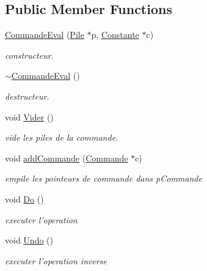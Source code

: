 \subsection*{Public Member Functions}
\begin{DoxyCompactItemize}
\item 
\hyperlink{class_commande_eval_ae7f29a48c48f9aaa6f218cb1642630eb}{Commande\-Eval} (\hyperlink{class_pile}{Pile} $\ast$p, \hyperlink{class_constante}{Constante} $\ast$c)
\begin{DoxyCompactList}\small\item\em constructeur. \end{DoxyCompactList}\item 
\hyperlink{class_commande_eval_ac545d7ad1c16bc7780132b1be79a137f}{$\sim$\-Commande\-Eval} ()
\begin{DoxyCompactList}\small\item\em destructeur. \end{DoxyCompactList}\item 
\hypertarget{class_commande_eval_ae16c7e11ada97aba12e9dfbaab0e8fa6}{void \hyperlink{class_commande_eval_ae16c7e11ada97aba12e9dfbaab0e8fa6}{Vider} ()}\label{class_commande_eval_ae16c7e11ada97aba12e9dfbaab0e8fa6}

\begin{DoxyCompactList}\small\item\em vide les piles de la commande. \end{DoxyCompactList}\item 
void \hyperlink{class_commande_eval_ad0055f5193a3d5fc0f7a3ee9fdcb09cb}{add\-Commande} (\hyperlink{class_commande}{Commande} $\ast$c)
\begin{DoxyCompactList}\small\item\em empile les pointeurs de commande dans p\-Commande \end{DoxyCompactList}\item 
void \hyperlink{class_commande_eval_a9a719eb128529581ef697284231bc805}{Do} ()
\begin{DoxyCompactList}\small\item\em executer l'operation \end{DoxyCompactList}\item 
void \hyperlink{class_commande_eval_a7bb0e495e43a30e5b7f0bf0d47cd37cf}{Undo} ()
\begin{DoxyCompactList}\small\item\em executer l'operation inverse \end{DoxyCompactList}\end{DoxyCompactItemize}


